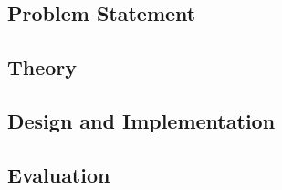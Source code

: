 
\subsection{Problem Statement}

\subsection{Theory}

\subsection{Design and Implementation}

\subsection{Evaluation}
